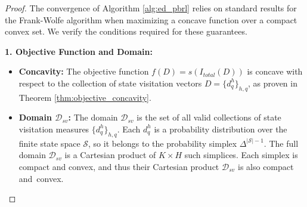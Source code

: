 \documentclass{article}
\newcommand{\mS}{\mathcal{S}}
\begin{document}
\begin{proof}
The convergence of Algorithm \ref{alg:ed_pbrl} relies on standard results for the Frank-Wolfe algorithm when maximizing a concave function over a compact convex set. We verify the conditions required for these guarantees.

\textbf{1. Objective Function and Domain:}
\begin{itemize}
    \item \textbf{Concavity:} The objective function $f(D) = s(I_{total}(D))$ is concave with respect to the collection of state visitation vectors $D = \{d^h_q\}_{h,q}$, as proven in Theorem \ref{thm:objective_concavity}.
    \item \textbf{Domain $\mathcal{D}_{sv}$:} The domain $\mathcal{D}_{sv}$ is the set of all valid collections of state visitation measures $\{d^h_q\}_{h,q}$. Each $d^h_q$ is a probability distribution over the finite state space $\mS$, so it belongs to the probability simplex $\Delta^{|\mS|-1}$. The full domain $\mathcal{D}_{sv}$ is a Cartesian product of $K \times H$ such simplices. Each simplex is compact and convex, and thus their Cartesian product $\mathcal{D}_{sv}$ is also compact and~convex.
\end{itemize}


\end{proof}
\end{document}
